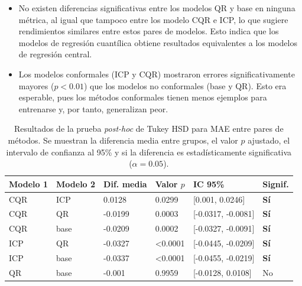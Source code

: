 \begin{itemize}

    \item No existen diferencias significativas entre los modelos QR y base en ninguna métrica, al igual que tampoco entre los modelo CQR e ICP, lo que sugiere rendimientos similares entre estos pares de modelos. Esto indica que los modelos de regresión cuantílica obtiene resultados equivalentes a los modelos de regresión central. 

    \item Los modelos conformales (ICP y CQR) mostraron errores significativamente mayores ($p<0.01$) que los modelos no conformales (base y QR). Esto era esperable, pues los métodos conformales tienen menos ejemplos para entrenarse y, por tanto, generalizan peor. 

\end{itemize}

\renewcommand{\arraystretch}{1.2}
\begin{table}[htbp]
    \small
    \centering
    \begin{tabular}{llllll}
    \toprule
    \textbf{Modelo 1} & \textbf{Modelo 2} & \textbf{Dif. media} & \textbf{Valor $p$} & \textbf{IC 95\%} & \textbf{Signif.} \\ \hline
    CQR & ICP & 0.0128 & 0.0299 & [0.001, 0.0246] & \textbf{Sí} \\
    CQR & QR & -0.0199 & 0.0003 & [-0.0317, -0.0081] & \textbf{Sí} \\
    CQR & base & -0.0209 & 0.0002 & [-0.0327, -0.0091] & \textbf{Sí} \\
    ICP & QR & -0.0327 & \textless 0.0001 & [-0.0445, -0.0209] & \textbf{Sí} \\
    ICP & base & -0.0337 & \textless 0.0001 & [-0.0455, -0.0219] & \textbf{Sí} \\
    QR & base & -0.001 & 0.9959 & [-0.0128, 0.0108] & No \\
    \bottomrule
    \end{tabular}
    \caption[
        Resultados de la prueba \textit{post-hoc} de Tukey HSD para MAE entre pares de métodos.
    ]{
        Resultados de la prueba \textit{post-hoc} de Tukey HSD para MAE entre pares de métodos.
        Se muestran la diferencia media entre grupos, el valor $p$ ajustado, el intervalo de confianza al 95\% y si la diferencia es estadísticamente significativa ($\alpha = 0.05$).
    }
    \label{tab:AE_tukey_mae}
\end{table}



